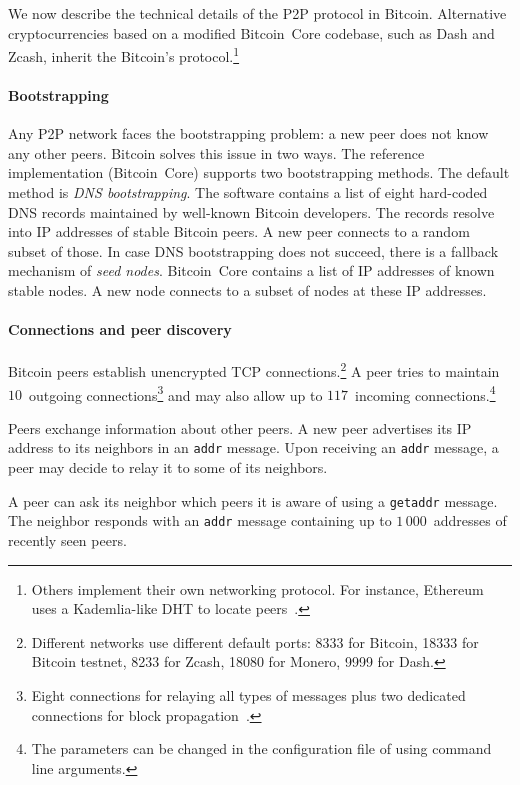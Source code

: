 We now describe the technical details of the P2P protocol in Bitcoin.
Alternative cryptocurrencies based on a modified Bitcoin~Core codebase, such as Dash and Zcash, inherit the Bitcoin's protocol.\footnote{Others implement their own networking protocol. For instance, Ethereum uses a Kademlia-like DHT to locate peers~\cite{Henningsen2019}.}

\paragraph{Bootstrapping}

Any P2P network faces the bootstrapping problem: a new peer does not know any other peers.
Bitcoin solves this issue in two ways.
The reference implementation (Bitcoin~Core) supports two bootstrapping methods.
The default method is \textit{DNS bootstrapping}.
The software contains a list of eight hard-coded DNS records maintained by well-known Bitcoin developers.
The records resolve into IP addresses of stable Bitcoin peers.
A new peer connects to a random subset of those.
In case DNS bootstrapping does not succeed, there is a fallback mechanism of \textit{seed nodes}.
Bitcoin~Core contains a list of IP addresses of known stable nodes.
A new node connects to a subset of nodes at these IP addresses.


\paragraph{Connections and peer discovery}

Bitcoin peers establish unencrypted TCP connections.\footnote{Different networks use different default ports: 8333 for Bitcoin, 18333 for Bitcoin testnet, 8233 for Zcash, 18080 for Monero, 9999 for Dash.}
A peer tries to maintain $10$~outgoing connections\footnote{Eight connections for relaying all types of messages plus two dedicated connections for block propagation~\cite{Daftuar2019}.} and may also allow up to $117$~incoming connections.\footnote{The parameters can be changed in the configuration file of using command line arguments.}

Peers exchange information about other peers.
A new peer advertises its IP address to its neighbors in an \texttt{addr} message.
Upon receiving an \texttt{addr} message, a peer may decide to relay it to some of its neighbors.

A peer can ask its neighbor which peers it is aware of using a \texttt{getaddr} message.
The neighbor responds with an \texttt{addr} message containing up to $1\,000$~addresses of recently seen peers.

